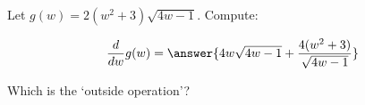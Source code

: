 \documentclass{ximera}
\author{Bobby Ramsey}
\begin{document}
\begin{exercise}
	Let $g(w) = 2(w^2+3)\sqrt{4w-1}$. 
	Compute:

	\[ \dd{w}g(w) =\answer{ 4w\sqrt{4w-1} + \frac{4(w^2+3)}{\sqrt{4w-1}}  } \]
	\begin{hint}
		Which is the `outside operation'?
			\begin{multipleChoice}
			\end{multipleChoice}
	\end{hint}
\end{exercise}
\end{document}
